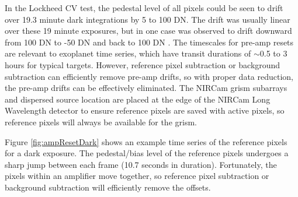 \documentclass[]{aastex62}
\begin{document}
In the Lockheed CV test, the pedestal level of all pixels could be seen to drift over 19.3 minute dark integrations by 5 to 100 DN.
The drift was usually linear over these 19 minute exposures, but in one case was observed to drift downward from 100 DN to -50 DN and back to 100 DN \citep{robberto2014refPixPreAmp}.
The timescales for pre-amp resets are relevant to exoplanet time series, which have transit durations of $\sim$0.5 to 3 hours for typical targets.
However, reference pixel subtraction or background subtraction can efficiently remove pre-amp drifts, so with proper data reduction, the pre-amp drifts can be effectively eliminated.
The NIRCam grism subarrays and dispersed source location are placed at the edge of the NIRCam Long Wavelength detector to ensure reference pixels are saved with active pixels, so reference pixels will always be available for the grism.

Figure \ref{fig:ampResetDark} shows an example time series of the reference pixels for a dark exposure.
The pedestal/bias level of the reference pixels undergoes a sharp jump between each frame (10.7 seconds in duration).
Fortunately, the pixels within an amplifier move together, so reference pixel subtraction or background subtraction will efficiently remove the offsets.
\end{document}
